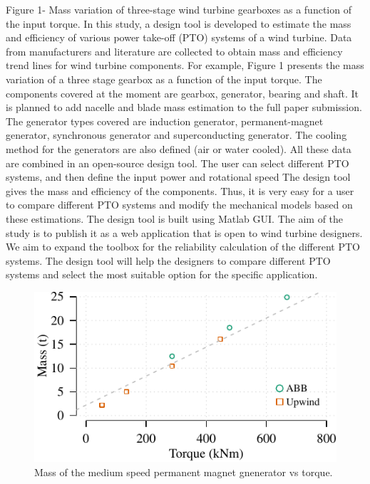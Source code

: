 \documentclass{article}\usepackage{graphicx, color}
\makeatletter
\def\maxwidth{ %
  \ifdim\Gin@nat@width>\linewidth
    \linewidth
  \else
    \Gin@nat@width
  \fi
}
\newenvironment{knitrout}{}{} %
\makeatother
\begin{document}
Figure 1- Mass variation of three-stage wind turbine gearboxes as a function of the input torque.
In this study, a design tool is developed to estimate the mass and efficiency of various power take-off (PTO) systems of a wind turbine. Data from manufacturers and literature are collected to obtain mass and efficiency trend lines for wind turbine components. For example, Figure 1 presents the mass variation of a three stage gearbox as a function of the input torque. The components covered at the moment are gearbox, generator, bearing and shaft. It is planned to add nacelle and blade mass estimation to the full paper submission. The generator types covered are induction generator, permanent-magnet generator, synchronous generator and superconducting generator. The cooling method for the generators are also defined (air or water cooled). 
All these data are combined in an open-source design tool. The user can select different PTO systems, and then define the input power and rotational speed The design tool gives the mass and efficiency of the components. Thus, it is very easy for a user to compare different PTO systems and modify the mechanical models based on these estimations. The design tool is built using Matlab GUI. The aim of the study is to publish it as a web application that is open to wind turbine designers. We aim to expand the toolbox for the reliability calculation of the different PTO systems. The design tool will help the designers to compare different PTO systems and select the most suitable option for the specific application.


\begin{knitrout}
\color{fgcolor}\begin{figure}[]

\includegraphics[width=\maxwidth]{figure/plot1gpm} \caption[Mass of the medium speed permanent magnet gnenerator vs torque]{Mass of the medium speed permanent magnet gnenerator vs torque.\label{fig:plot1gpm}}
\end{figure}


\end{knitrout}
\end{document}
